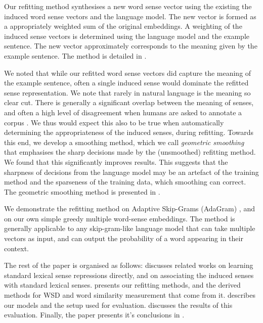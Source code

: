 \documentclass{sig-alternate}
\begin{document}
Our refitting method synthesises a new word sense vector using the existing the induced word sense vectors and the language model.
The new vector is formed as a appropriately weighted sum of the original embeddings. A weighting of the induced sense vectors is determined using the language model and the example sentence. The new vector approximately corresponds to the meaning given by the example sentence. The method is detailed in .

We noted that while our refitted word sense vectors did capture the meaning of the example sentence, often a single induced sense would dominate the refitted sense representation. We note that rarely in natural language is the meaning so clear cut. There is generally a  significant overlap between the meaning of senses, and often a high level of disagreement when humans are asked to annotate a corpus \parencite{veronis1998study}. We thus would expect this also to be true when automatically determining the appropriateness of the induced senses, during refitting. Towards this end, we develop a smoothing method, which we call \emph{geometric smoothing} that emphasises the sharp decisions made by the (unsmoothed) refitting method. We found that this significantly improves results. This suggests that the sharpness of decisions from the language model may be an artefact of the training method and the sparseness of the training data, which smoothing can correct. The geometric smoothing method is presented in .



We demonstrate the refitting method on Adaptive Skip-Grams (AdaGram) \parencite{AdaGrams}, and on our own simple greedy multiple word-sense embeddings. The method is generally applicable to any skip-gram-like language model that can take multiple vectors as input, and can output the probability of a word appearing in their context.



The rest of the paper is organised as follows:  discusses related works on learning standard lexical sense repressions directly, and on associating the induced senses with standard lexical senses.  presents our refitting methods, and the derived methods for WSD and word similarity measurement that come from it.  describes our models and the setup used for evaluation.  discusses the results of this evaluation. Finally, the paper presents it's conclusions in .
\end{document}
